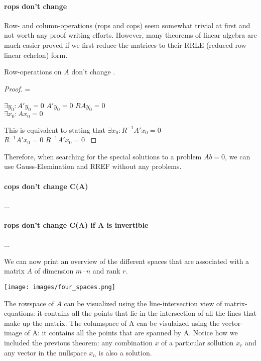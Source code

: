 \paragraph{rops don't change }
Row- and column-operations (rops and cops) seem somewhat trivial at first and not worth any proof writing efforts. However, many theorems of linear algebra are much easier proved if we first reduce the matrices to their RRLE (reduced row linear echelon) form.

\begin{theorem}
  Row-operations on $A$ don't change . 
\end{theorem}

\begin{proof}
     { = } {
         {$\exists y_0: A'y_0 = 0$} {
             {$A'y_0 = 0$} {
                $RAy_0 = 0$
            }
        } \\
         {$\exists x_0: Ax_0 = 0$} {
            This is equivalent to stating that $\exists x_0: R^{-1} A' x_0 = 0$ \\
             {$R^{-1} A' x_0 = 0$} {
                $R^{-1} A' x_0 = 0$
            }
            
        }
    } 
\end{proof}

Therefore, when searching for the special solutions to a problem $Ab = 0$, we can use Gauss-Elemination and RREF without any problems.

\paragraph{cops don't change C(A)} ...

\paragraph{rops don't change C(A) if A is invertible }...

We can now print an overview of the different spaces that are associated with a matrix $A$ of dimension $m \cdot n$ and rank $r$.

\texttt{[image: images/four\_spaces.png]}

The rowspace of $A$ can be visualized using the line-intersection view of matrix-equations: it contains all the points that lie in the intersection of all the lines that make up the matrix. The columspace of A can be visulaized using the vector-image of A: it contains all the points that are spanned by A. 
Notice how we included the previous theorem: any combination $x$ of a particular sollution $x_r$ and any vector in the nullspace $x_n$ is also a solution.


